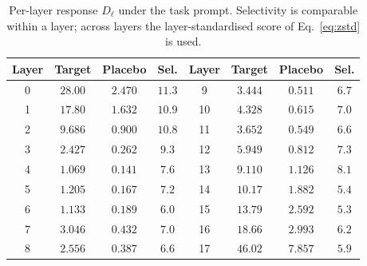\begin{table}[t]
\caption{Per-layer response $D_\ell$ under the task prompt. Selectivity is
comparable within a layer; across layers the layer-standardised score of
Eq.~\ref{eq:zstd} is used.}
\label{tab:cf-layers}
\begin{center}
\small
\begin{tabular}{cccc|cccc}
\hline
Layer & Target & Placebo & Sel. & Layer & Target & Placebo & Sel. \\
\hline
0 & $28.00$ & $2.470$ & $11.3$ & 9  & $3.444$ & $0.511$ & $6.7$ \\
1 & $17.80$ & $1.632$ & $10.9$ & 10 & $4.328$ & $0.615$ & $7.0$ \\
2 & $9.686$ & $0.900$ & $10.8$ & 11 & $3.652$ & $0.549$ & $6.6$ \\
3 & $2.427$ & $0.262$ & $9.3$  & 12 & $5.949$ & $0.812$ & $7.3$ \\
4 & $1.069$ & $0.141$ & $7.6$  & 13 & $9.110$ & $1.126$ & $8.1$ \\
5 & $1.205$ & $0.167$ & $7.2$  & 14 & $10.17$ & $1.882$ & $5.4$ \\
6 & $1.133$ & $0.189$ & $6.0$  & 15 & $13.79$ & $2.592$ & $5.3$ \\
7 & $3.046$ & $0.432$ & $7.0$  & 16 & $18.66$ & $2.993$ & $6.2$ \\
8 & $2.556$ & $0.387$ & $6.6$  & 17 & $46.02$ & $7.857$ & $5.9$ \\
\hline
\end{tabular}
\end{center}
\end{table}

